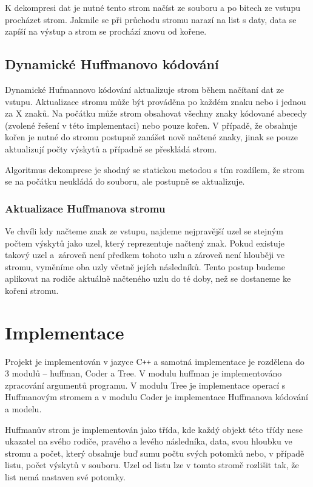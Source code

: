 \documentclass[11pt,a4paper,titlepage]{article}
\begin{document}
            K dekompresi dat je nutné tento strom načíst ze souboru a po bitech ze vstupu procházet strom. Jakmile
            se při průchodu stromu narazí na list s daty, data se zapíší na výstup a strom se prochází znovu od kořene.

        \subsection{Dynamické Huffmanovo kódování}
            Dynamické Hufmannovo kódování aktualizuje strom během načítaní dat ze vstupu. Aktualizace stromu
            může být prováděna po každém znaku nebo i jednou za X znaků. Na počátku může strom obsahovat
            všechny znaky kódované abecedy (zvolené řešení v této implementaci) nebo pouze kořen. V případě,
            že obsahuje kořen je nutné do stromu postupně zanášet nově načtené znaky, jinak se pouze aktualizují
            počty výskytů a případně se přeskládá strom.

            Algoritmus dekomprese je shodný se statickou metodou s tím rozdílem, že strom se na počátku neukládá
            do souboru, ale postupně se aktualizuje.

            \subsubsection{Aktualizace Huffmanova stromu}
                Ve chvíli kdy načteme znak ze vstupu, najdeme nejpravější uzel
                se stejným počtem výskytů jako uzel, který reprezentuje načtený znak. Pokud existuje
                takový uzel a~zároveň není předkem tohoto uzlu a zároveň není hlouběji ve stromu, vyměníme
                oba uzly včetně jejích následníků. Tento postup budeme aplikovat na rodiče aktuálně načteného
                uzlu do té doby, než se dostaneme ke kořeni stromu.

    \section{Implementace}
        Projekt je implementován v jazyce C\texttt{++} a samotná implementace je rozdělena do 3 modulů -- huffman, Coder a Tree.
        V modulu huffman je implementováno zpracování argumentů programu. V modulu Tree je implementace operací s Huffmanovým stromem
        a v modulu Coder je implementace Huffmanova kódování a modelu.

        Huffmanův strom je implementován jako třída, kde každý objekt této třídy nese ukazatel na svého rodiče, pravého a levého následníka,
        data, svou hloubku ve stromu a počet, který obsahuje buď sumu počtu svých potomků nebo, v případě listu, počet výskytů v souboru.
        Uzel od listu lze v tomto stromě rozlišit tak, že list nemá nastaven své potomky.
\end{document}
